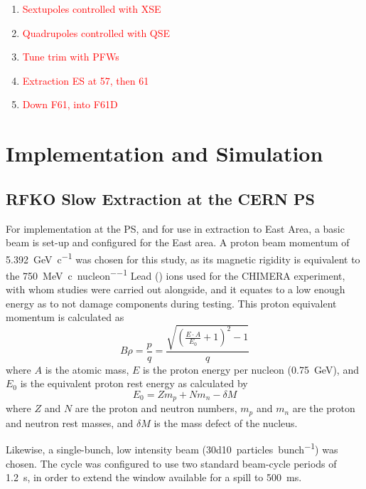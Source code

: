 \documentclass[11pt]{report}
\newcommand\todo[1]{\textcolor{red}{#1}}
\begin{document}
\begin{enumerate}
  \item \todo{Sextupoles controlled with XSE}
  \item \todo{Quadrupoles controlled with QSE}
  \item \todo{Tune trim with PFWs}
  \item \todo{Extraction ES at 57, then 61}
  \item \todo{Down F61, into F61D}
\end{enumerate}

\chapter{Implementation and Simulation}

\section{RFKO Slow Extraction at the CERN PS}

For implementation at the PS, and for use in extraction to East Area, a basic beam is set-up and configured for the East area. A proton beam momentum of \qty[per-mode=symbol]{5.392}{\giga\electronvolt\per~c} was chosen for this study, as its magnetic rigidity is equivalent to the \qty[per-mode=symbol]{750}{\mega\electronvolt\per~c\per nucleon} Lead () ions used for the CHIMERA experiment, with whom studies were carried out alongside, and it equates to a low enough energy as to not damage components during testing. This proton equivalent momentum is calculated as
\begin{equation}
  B\rho = \frac pq = \frac{\sqrt{\left(\frac{E\cdot A}{E_0}+1\right)^2-1}}q
  \label{eq:proton-equivalent}
\end{equation}
where $A$ is the atomic mass, $E$ is the proton energy per nucleon (\qty{0.75}{\giga\electronvolt}), and $E_0$ is the equivalent proton rest energy as calculated by
\begin{equation}
  E_0 = Zm_p + Nm_n - \delta M
\end{equation} where $Z$ and $N$ are the proton and neutron numbers, $m_p$ and $m_n$ are the proton and neutron rest masses, and $\delta M$ is the mass defect of the nucleus.

Likewise, a single-bunch, low intensity beam (\qty[per-mode=symbol]{30d10}{particles\per bunch}) was chosen. The cycle was configured to use two standard beam-cycle periods of \qty{1.2}{\second}, in order to extend the window available for a spill to \qty{500}{\milli\second}.
\end{document}
